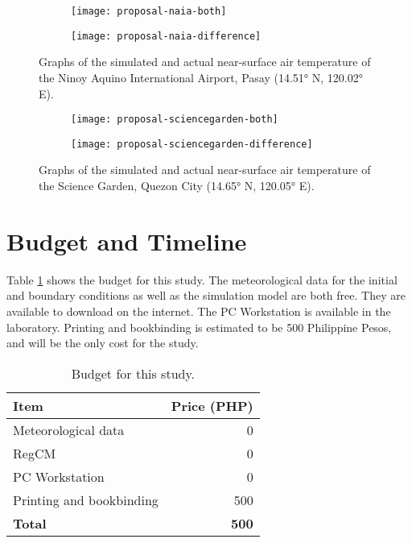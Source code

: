 	\begin{figure}
		\centering
		\begin{subfigure}{\textwidth}
			\texttt{[image: proposal-naia-both]}
		\end{subfigure}
		\begin{subfigure}{\textwidth}
			\texttt{[image: proposal-naia-difference]}
		\end{subfigure}
		\caption{
			Graphs of the simulated and actual near-surface air temperature of the Ninoy Aquino International Airport, Pasay (\ang{14.51} N, \ang{120.02} E).
		}
		\label{fig:proposal-naia-results}
	\end{figure}

	\begin{figure}
		\centering
		\begin{subfigure}{\textwidth}
			\texttt{[image: proposal-sciencegarden-both]}
		\end{subfigure}
		\begin{subfigure}{\textwidth}
			\texttt{[image: proposal-sciencegarden-difference]}
		\end{subfigure}
		\caption{
			Graphs of the simulated and actual near-surface air temperature of the Science Garden, Quezon City (\ang{14.65} N, \ang{120.05} E).
		}
		\label{fig:proposal-sciencegarden-results}
	\end{figure}

\section{Budget and Timeline}

	Table \ref{tab:budget} shows the budget for this study.
	The meteorological data for the initial and boundary conditions as well as the simulation model are both free.
	They are available to download on the internet.
	The PC Workstation is available in the laboratory.
	Printing and bookbinding is estimated to be 500 Philippine Pesos,
		and will be the only cost for the study.

	\begin{table}
		\caption{Budget for this study.}
		\label{tab:budget}
		\centering
		\begin{tabular}{l r}
			\hline \hline
			Item & Price (PHP) \\
			\hline
			Meteorological data	& 0 \\
			RegCM & 0 \\
			PC Workstation & 0 \\
			Printing and bookbinding & 500 \\
			\hline
			\textbf{Total} & \textbf{500} \\
			\hline
		\end{tabular}
	\end{table}